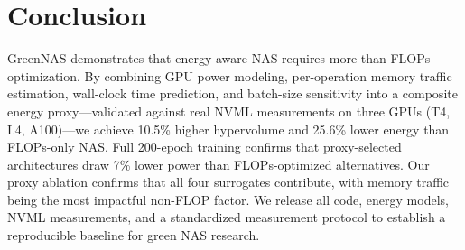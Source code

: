 \documentclass[10pt,twocolumn,letterpaper]{article}
\begin{document}
\section{Conclusion}
\label{sec:conclusion}

GreenNAS demonstrates that energy-aware NAS requires more than FLOPs optimization. By combining GPU power modeling, per-operation memory traffic estimation, wall-clock time prediction, and batch-size sensitivity into a composite energy proxy---validated against real NVML measurements on three GPUs (T4, L4, A100)---we achieve 10.5\% higher hypervolume and 25.6\% lower energy than FLOPs-only NAS. Full 200-epoch training confirms that proxy-selected architectures draw 7\% lower power than FLOPs-optimized alternatives. Our proxy ablation confirms that all four surrogates contribute, with memory traffic being the most impactful non-FLOP factor. We release all code, energy models, NVML measurements, and a standardized measurement protocol to establish a reproducible baseline for green NAS research.

{
    \small
    
    
}
\end{document}
